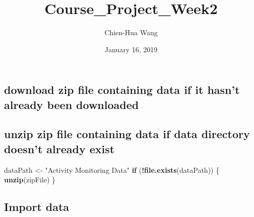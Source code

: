 \documentclass[]{article}
\title{Course\_Project\_Week2}
\author{Chien-Hua Wang}
\date{January 16, 2019}
\newenvironment{Shaded}{\begin{snugshade}}{\end{snugshade}}
\newcommand{\KeywordTok}[1]{\textcolor[rgb]{0.13,0.29,0.53}{\textbf{#1}}}
\newcommand{\DataTypeTok}[1]{\textcolor[rgb]{0.13,0.29,0.53}{#1}}
\newcommand{\StringTok}[1]{\textcolor[rgb]{0.31,0.60,0.02}{#1}}
\newcommand{\CommentTok}[1]{\textcolor[rgb]{0.56,0.35,0.01}{\textit{#1}}}
\newcommand{\ControlFlowTok}[1]{\textcolor[rgb]{0.13,0.29,0.53}{\textbf{#1}}}
\newcommand{\OperatorTok}[1]{\textcolor[rgb]{0.81,0.36,0.00}{\textbf{#1}}}
\newcommand{\NormalTok}[1]{#1}
\begin{document}
\maketitle

\subsection{download zip file containing data if it hasn't already been
downloaded}\label{download-zip-file-containing-data-if-it-hasnt-already-been-downloaded}

\begin{Shaded}
\end{Shaded}

\subsection{unzip zip file containing data if data directory doesn't
already
exist}\label{unzip-zip-file-containing-data-if-data-directory-doesnt-already-exist}

\begin{Shaded}
\begin{Highlighting}[]
\NormalTok{dataPath <-}\StringTok{ "Activity Monitoring Data"}
\ControlFlowTok{if}\NormalTok{ (}\OperatorTok{!}\KeywordTok{file.exists}\NormalTok{(dataPath)) \{}
  \KeywordTok{unzip}\NormalTok{(zipFile)}
\NormalTok{\}}
\end{Highlighting}
\end{Shaded}

\subsection{Import data}\label{import-data}

\begin{Shaded}
\end{Shaded}
\end{document}
